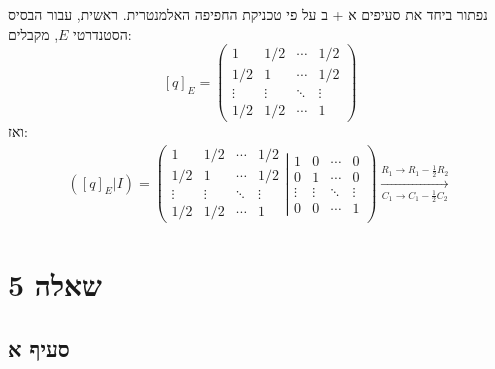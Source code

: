 \documentclass{article}
\begin{document}
נפתור ביחד את סעיפים א + ב על פי טכניקת החפיפה האלמנטרית.
ראשית, עבור הבסיס הסטנדרטי $E$, מקבלים:
\[
    [q]_E = \begin{pmatrix}
        1      & 1/2    & \cdots & 1/2    \\
        1/2    & 1      & \cdots & 1/2    \\
        \vdots & \vdots & \ddots & \vdots \\
        1/2    & 1/2    & \cdots & 1
    \end{pmatrix}
\]
ואז:
\begin{align*}
    ([q]_E | I)=\left(
    \begin{matrix}
            1      & 1/2    & \cdots & 1/2    \\
            1/2    & 1      & \cdots & 1/2    \\
            \vdots & \vdots & \ddots & \vdots \\
            1/2    & 1/2    & \cdots & 1
        \end{matrix}
    \left|
    \begin{matrix}
            1      & 0      & \cdots & 0      \\
            0      & 1      & \cdots & 0      \\
            \vdots & \vdots & \ddots & \vdots \\
            0      & 0      & \cdots & 1
        \end{matrix}
    \right.
    \right)
    \xrightarrow[C_{1}\rightarrow C_1-\frac{1}{2}C_2]{R_{1}\rightarrow R_{1}-\frac{1}{2}R_2}
\end{align*}

\pagebreak

\section*{שאלה 5}

\subsection*{סעיף א}
\end{document}
